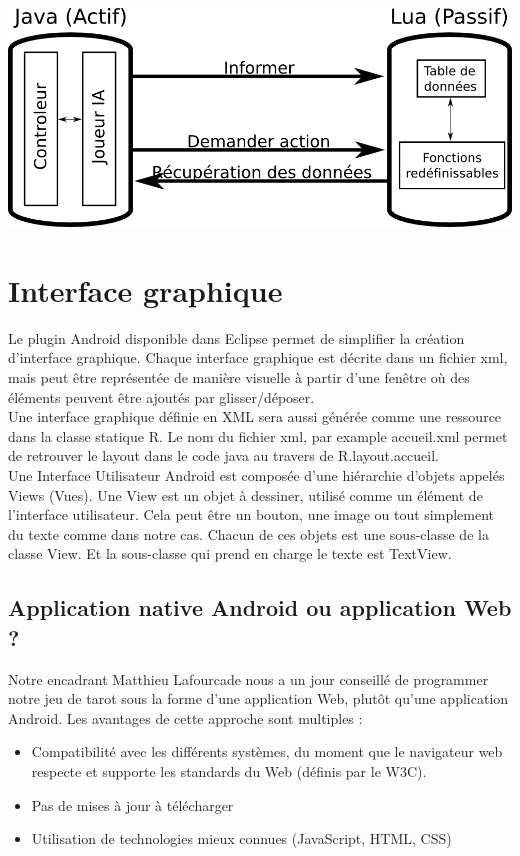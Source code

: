 \documentclass[a4paper]{report}
\begin{document}
				\begin{center}
					\includegraphics[scale=0.3]{Images/javalua.png}
				\end{center}


	\section{Interface graphique}
		Le plugin Android disponible dans Eclipse permet de simplifier la création d'interface graphique.
		Chaque interface graphique est décrite dans un fichier xml, mais peut être représentée de manière
		visuelle à partir d'une fenêtre où des éléments peuvent être ajoutés par glisser/déposer.\\
		Une interface graphique définie en XML sera aussi générée comme une ressource dans la classe statique
		R. Le nom du fichier xml, par example accueil.xml permet de retrouver le layout dans le code java au
		travers de R.layout.accueil.\\
		Une Interface Utilisateur Android est composée d’une hiérarchie d’objets appelés Views (Vues).
		Une View est un objet à dessiner, utilisé comme un élément de l’interface utilisateur. Cela peut être un bouton, une image ou tout simplement du texte comme dans notre cas. Chacun de 			ces objets est une sous-classe de la classe View. Et la sous-classe qui prend en charge le texte est TextView.\\
		
		\subsection{Application native Android ou application Web ?}
			Notre encadrant Matthieu Lafourcade nous a un jour conseillé de programmer notre jeu de tarot sous la forme d’une application Web, plutôt qu’une application Android. Les 				avantages de cette approche sont multiples :\\
			\begin{itemize}
			    \item Compatibilité avec les différents systèmes, du moment que le navigateur web respecte et supporte les standards du Web (définis par le W3C).
			    \item Pas de mises à jour à télécharger
			    \item Utilisation de technologies mieux connues (JavaScript, HTML, CSS)
			\end{itemize}
\end{document}
